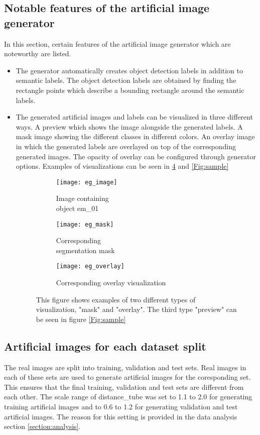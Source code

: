 \documentclass[paper=a4,11pt,parskip=half,toc=listof]{scrartcl}
\begin{document}
	
\subsection{Notable features of the artificial image generator}
In this section, certain features of the artificial image generator which are noteworthy are listed.
	\begin{itemize}
		\item The generator automatically creates object detection labels in addition to semantic labels. The object detection labels are obtained by finding the rectangle points which describe a bounding rectangle around the semantic labels.
		\item The generated artificial images and labels can be visualized in three different ways. A preview which shows the image alongside the generated labels. A mask image showing the different classes in different colors. An overlay image in which the generated labels are overlayed on top of the corresponding generated images. The opacity of overlay can be configured through generator options. Examples of visualizations can be seen in \ref{Fig:visuals} and \ref{Fig:sample}
		\begin{figure}[!htb]
			\centering
			\begin{subfigure}{.3\textwidth}
  				\centering
  				\texttt{[image: eg\_image]}
  				\caption{Image containing \\object em\_01}
  				\label{Fig:visualsa}
			\end{subfigure}%
			\begin{subfigure}{.3\textwidth}
  				\centering
  				\texttt{[image: eg\_mask]}
  				\caption{Corresponding \\segmentation mask}
  				\label{Fig:visualsb}
			\end{subfigure}%
			\begin{subfigure}{.3\textwidth}
  				\centering
  				\texttt{[image: eg\_overlay]}
  				\caption{Corresponding overlay visualization}
  				\label{Fig:visualsc}
			\end{subfigure}%
		\caption{This figure shows examples of two different types of visualization, "mask" and "overlay". The third type "preview" can be seen in figure \ref{Fig:sample}}
		\label{Fig:visuals}
		\end{figure}
		
	\end{itemize}
	
\subsection{Artificial images for each dataset split}
The real images are split into training, validation and test sets. Real images in each of these sets are used to generate artificial images for the coresponding set. This ensures that the final training, validation and test sets are different from each other. The scale range of distance\_tube was set to 1.1 to 2.0 for generating training artificial images and to 0.6 to 1.2 for generating validation and test artificial images. The reason for this setting is provided in the data analysis section \ref{section:analysis}.
\end{document}
